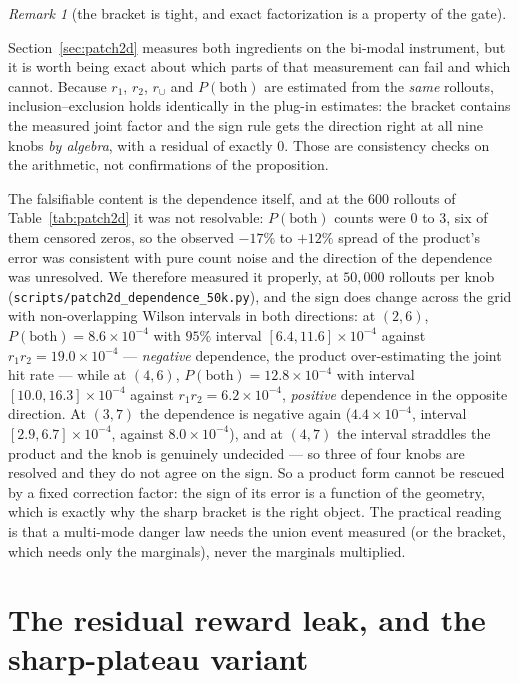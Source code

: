 \documentclass[11pt]{article}
\theoremstyle{definition}
\theoremstyle{remark}
\newtheorem{remark}{Remark}
\begin{document}
\begin{remark}[the bracket is tight, and exact factorization is a property of the gate]
\end{remark}

Section~\ref{sec:patch2d} measures both ingredients on the bi-modal instrument, but it is worth being exact about which parts of that measurement can fail and which cannot. Because $r_1$, $r_2$, $r_\cup$ and $P(\text{both})$ are estimated from the \emph{same} rollouts, inclusion--exclusion holds identically in the plug-in estimates: the bracket contains the measured joint factor and the sign rule gets the direction right at all nine knobs \emph{by algebra}, with a residual of exactly $0$. Those are consistency checks on the arithmetic, not confirmations of the proposition.

The falsifiable content is the dependence itself, and at the $600$ rollouts of Table~\ref{tab:patch2d} it was not resolvable: $P(\text{both})$ counts were $0$ to $3$, six of them censored zeros, so the observed $-17\%$ to $+12\%$ spread of the product's error was consistent with pure count noise and the direction of the dependence was unresolved. We therefore measured it properly, at $50{,}000$ rollouts per knob (\texttt{scripts/\allowbreak patch2d\_\allowbreak dependence\_\allowbreak 50k.py}), and the sign does change across the grid with non-overlapping Wilson intervals in both directions: at $(2,6)$, $P(\text{both}) = 8.6\times10^{-4}$ with $95\%$ interval $[6.4, 11.6]\times10^{-4}$ against $r_1r_2 = 19.0\times10^{-4}$ --- \emph{negative} dependence, the product over-estimating the joint hit rate --- while at $(4,6)$, $P(\text{both}) = 12.8\times10^{-4}$ with interval $[10.0, 16.3]\times10^{-4}$ against $r_1r_2 = 6.2\times10^{-4}$, \emph{positive} dependence in the opposite direction. At $(3,7)$ the dependence is negative again ($4.4\times10^{-4}$, interval $[2.9, 6.7]\times10^{-4}$, against $8.0\times10^{-4}$), and at $(4,7)$ the interval straddles the product and the knob is genuinely undecided --- so three of four knobs are resolved and they do not agree on the sign. So a product form cannot be rescued by a fixed correction factor: the sign of its error is a function of the geometry, which is exactly why the sharp bracket is the right object. The practical reading is that a multi-mode danger law needs the union event measured (or the bracket, which needs only the marginals), never the marginals multiplied.


\section{The residual reward leak, and the sharp-plateau variant}
\label{sup:sharp}
\end{document}
